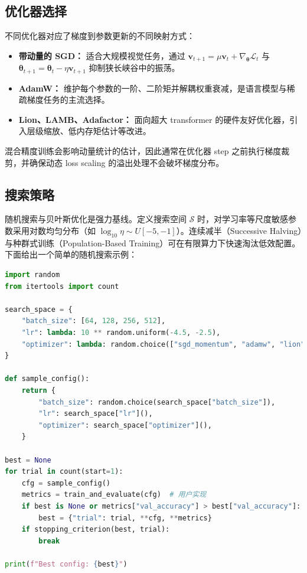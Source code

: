 \documentclass[UTF8,zihao=-4]{ctexart}
\begin{document}
\subsection{优化器选择}
不同优化器对应了梯度到参数更新的不同映射方式：
\begin{itemize}
  \item \textbf{带动量的 SGD：} 适合大规模视觉任务，通过 $\mathbf{v}_{t+1} = \mu \mathbf{v}_t + \nabla_{\boldsymbol{\theta}} \mathcal{L}_t$ 与 $\boldsymbol{\theta}_{t+1} = \boldsymbol{\theta}_t - \eta \mathbf{v}_{t+1}$ 抑制狭长峡谷中的振荡。
  \item \textbf{AdamW：} 维护每个参数的一阶、二阶矩并解耦权重衰减，是语言模型与稀疏梯度任务的主流选择。
  \item \textbf{Lion、LAMB、Adafactor：} 面向超大 transformer 的硬件友好优化器，引入层级缩放、低内存矩估计等改进。
\end{itemize}
混合精度训练会影响动量统计的估计，因此通常在优化器 step 之前执行梯度裁剪，并确保动态 loss scaling 的溢出处理不会破坏梯度分布。

\subsection{搜索策略}
随机搜索与贝叶斯优化是强力基线。定义搜索空间 $\mathcal{S}$ 时，对学习率等尺度敏感参数采用对数均匀分布（如 $\log_{10} \eta \sim U[-5, -1]$）。连续减半（Successive Halving）与种群式训练（Population-Based Training）可在有限算力下快速淘汰低效配置。下面给出一个简单的随机搜索示例：

\begin{lstlisting}[language=Python, caption={批大小、学习率与优化器的随机搜索示例。}]
import random
from itertools import count

search_space = {
    "batch_size": [64, 128, 256, 512],
    "lr": lambda: 10 ** random.uniform(-4.5, -2.5),
    "optimizer": lambda: random.choice(["sgd_momentum", "adamw", "lion"]),
}

def sample_config():
    return {
        "batch_size": random.choice(search_space["batch_size"]),
        "lr": search_space["lr"](),
        "optimizer": search_space["optimizer"](),
    }

best = None
for trial in count(start=1):
    cfg = sample_config()
    metrics = train_and_evaluate(cfg)  # 用户实现
    if best is None or metrics["val_accuracy"] > best["val_accuracy"]:
        best = {"trial": trial, **cfg, **metrics}
    if stopping_criterion(best, trial):
        break

print(f"Best config: {best}")
\end{lstlisting}
\end{document}
